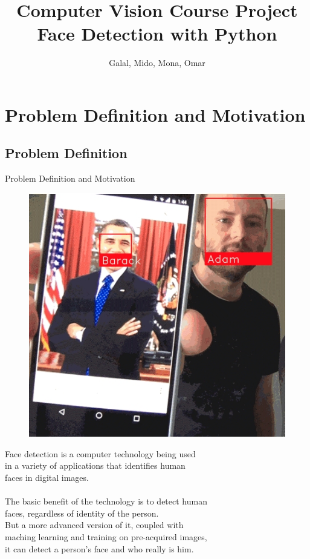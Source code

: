 \documentclass[10pt]{beamer}
\author{Galal, Mido, Mona, Omar}
\title{%
		Computer Vision Course Project \\
  \small Face Detection with Python}
\begin{document}
\begin{frame}
\titlepage
\end{frame}


\begin{frame}
\tableofcontents
\end{frame}

\section{Problem Definition and Motivation}

\subsection{Problem Definition}

\begin{frame}{Problem Definition and Motivation}

\begin{figure}
\vspace*{-1cm}
\hspace*{8.2cm}
\includegraphics[scale=0.2]{images/obama}
\end{figure}

\vspace*{-5cm}
\hspace*{0cm}

Face detection is a computer technology being used \\
in a variety of applications that identifies human \\
faces in digital images.\\~\\


The basic benefit of the technology is to detect human \\
faces, regardless of identity of the person. \\
But a more advanced version of it, coupled with \\
maching learning and training on pre-acquired images, \\
it can detect a person's face and who really is him.

\end{frame}
\end{document}
